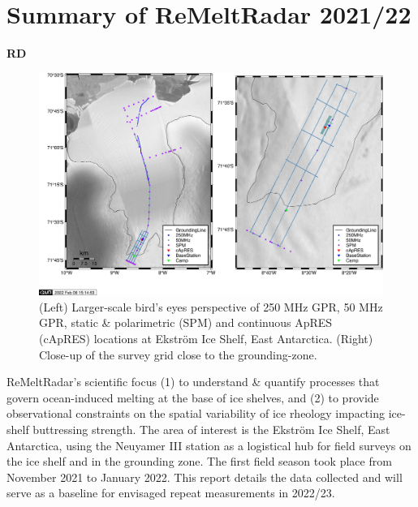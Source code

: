 \documentclass[a4paper,12pt]{article}
\begin{document}
\section{Summary of ReMeltRadar 2021/22}
\textbf{RD}

\begin{figure}
  \includegraphics[width=\linewidth]{Figures/Overview.png}
  \caption{(Left) Larger-scale bird's eyes perspective of 250 MHz GPR, 50 MHz GPR, static \& polarimetric (SPM) and continuous ApRES (cApRES) locations at Ekström Ice Shelf, East Antarctica. (Right) Close-up of the survey grid close to the grounding-zone.}
  \label{fig:overview}
\end{figure}
ReMeltRadar's scientific focus (1) to understand \& quantify processes that govern ocean-induced melting at the base of ice shelves, and (2) to provide observational constraints on the spatial variability of ice rheology impacting ice-shelf buttressing strength. The area of interest is the Ekström Ice Shelf, East Antarctica, using the Neuyamer III station as a logistical hub for field surveys on the ice shelf and in the grounding zone. The first field season took place from November 2021 to January 2022. This report details the data collected and will serve as a baseline for envisaged repeat measurements in 2022/23. 

\pagebreak
\end{document}
